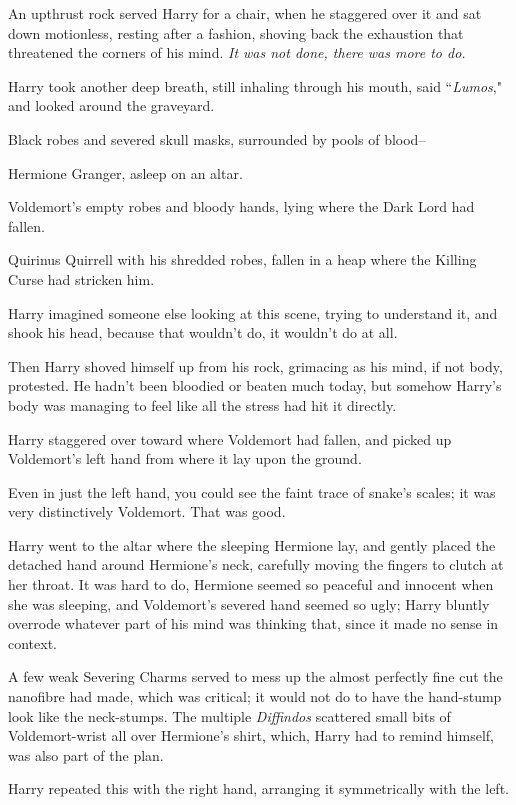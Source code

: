 An upthrust rock served Harry for a chair, when he staggered over it and sat down motionless, resting after a fashion, shoving back the exhaustion that threatened the corners of his mind. \emph{It was not done, there was more to do.}

Harry took another deep breath, still inhaling through his mouth, said ``\emph{Lumos}," and looked around the graveyard.

Black robes and severed skull masks, surrounded by pools of blood\---

Hermione Granger, asleep on an altar.

Voldemort's empty robes and bloody hands, lying where the Dark Lord had fallen.

Quirinus Quirrell with his shredded robes, fallen in a heap where the Killing Curse had stricken him.

Harry imagined someone else looking at this scene, trying to understand it, and shook his head, because that wouldn't do, it wouldn't do at all.

Then Harry shoved himself up from his rock, grimacing as his mind, if not body, protested. He hadn't been bloodied or beaten much today, but somehow Harry's body was managing to feel like all the stress had hit it directly.

Harry staggered over toward where Voldemort had fallen, and picked up Voldemort's left hand from where it lay upon the ground.

Even in just the left hand, you could see the faint trace of snake's scales; it was very distinctively Voldemort. That was good.

Harry went to the altar where the sleeping Hermione lay, and gently placed the detached hand around Hermione's neck, carefully moving the fingers to clutch at her throat. It was hard to do, Hermione seemed so peaceful and innocent when she was sleeping, and Voldemort's severed hand seemed so ugly; Harry bluntly overrode whatever part of his mind was thinking that, since it made no sense in context.

A few weak Severing Charms served to mess up the almost perfectly fine cut the nanofibre had made, which was critical; it would not do to have the hand-stump look like the neck-stumps. The multiple \emph{Diffindos} scattered small bits of Voldemort-wrist all over Hermione's shirt, which, Harry had to remind himself, was also part of the plan.

Harry repeated this with the right hand, arranging it symmetrically with the left.

